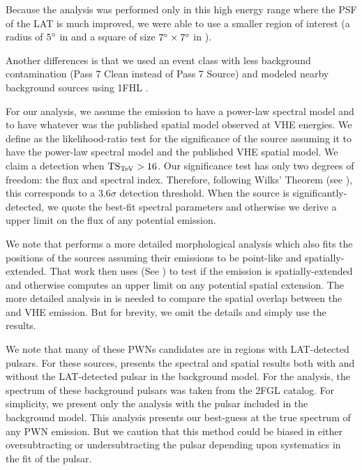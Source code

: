 Because the analysis was performed only in this high energy range where
the \ac{PSF} of the \ac{LAT} is much improved, we were able to use a
smaller region of interest (a radius of $5^\circ$ in \pointlike and a
square of size $7^\circ\times7^\circ$ in \gtlike).

Another differences is that we used an event class with less
background contamination (Pass 7 Clean instead of Pass 7
Source) and modeled nearby background sources using \ac{1FHL}
\citep{ackermann_2013a_first-fermi-lat}.

For our analysis, we assume the \gev emission to have a power-law spectral
model and to have whatever was the published spatial model observed at
\ac{VHE} energies.  We define \tstev as the likelihood-ratio test for
the significance of the source assuming it to have the power-law spectral
model and the published \ac{VHE} spatial model.  We claim a detection when
$\mathrm{TS}_\text{TeV} > 16$.  Our significance test has only two degrees of freedom:
the flux and spectral index.  Therefore, following Wilks' Theorem (see
), this corresponds to a $3.6\sigma$
detection threshold. When the source is significantly-detected, we quote
the best-fit spectral parameters and otherwise we derive a upper limit
on the flux of any potential emission.

We note that \cite{acero_2013a_constraints-galactic} performs a more
detailed morphological analysis which also fits the positions of the
sources assuming their emissions to be point-like and spatially-extended.
That work then uses \tsext (See ) to test
if the emission is spatially-extended and otherwise computes an upper
limit on any potential spatial extension.  The more detailed analysis in
\cite{acero_2013a_constraints-galactic} is needed to compare the spatial
overlap between the \gev and \ac{VHE} emission. But for brevity, we omit
the details and simply use the results.

We note that many of these \acp{PWN} candidates are in
regions with \ac{LAT}-detected pulsars.  For these sources,
\cite{acero_2013a_constraints-galactic} presents the spectral and spatial
results both with and without the \ac{LAT}-detected pulsar in the
background model. For the analysis, the spectrum of these background
pulsars was taken from the \ac{2FGL} catalog.  For simplicity, we
present only the analysis with the pulsar included in the background
model. This analysis presents our best-guess at the true spectrum of
any \ac{PWN} emission.  But we caution that this method could be biased
in either oversubtracting or undersubtracting the pulsar depending upon
systematics in the fit of the pulsar.

